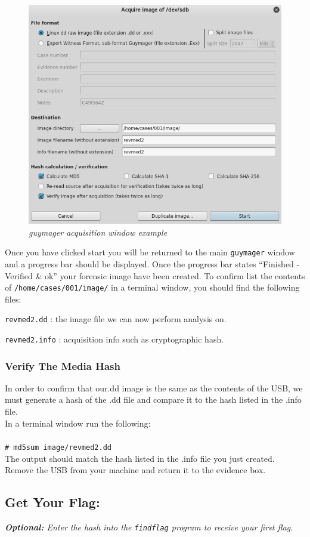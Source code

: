 \documentclass[a4paper,11pt]{article}
\begin{document}
\begin{figure}[h]
	\centering
	\includegraphics[scale=0.5]{guymager-aquisition-window}
	\caption{\textit{guymager acquisition window example}}
	\label{fig:guymager-aquisition-window}
\end{figure}

\newpage
Once you have clicked start you will be returned to the main \texttt{guymager} window and a progress bar should be displayed. Once the progress bar states ``Finished - Verified {\&} ok'' your forensic image have been created. To confirm list the contents of \texttt{/home/cases/001/image/} in a terminal window, you should find the following files: 
\begin{itemize*}
\item \texttt{revmed2.dd} : the image file we can now perform analysis on.
\item \texttt{revmed2.info} : acquisition info such as cryptographic hash.
\end{itemize*}

\subsubsection*{Verify The Media Hash}
In order to confirm that our.dd image is the same as the contents of the USB, we must generate a hash of the .dd file and compare it to the hash listed in the .info file.
\\
In a terminal window run the following:\\ \\
\texttt{{\#} md5sum image/revmed2.dd}\\
The output should match the hash listed in the .info file you just created.\\

\noindent
Remove the USB from your machine and return it to the evidence box.

\subsection*{Get Your Flag:}
\noindent
\textit{\textbf{Optional:} Enter the hash into the \texttt{findflag} program to receive your first flag.}
\end{document}
